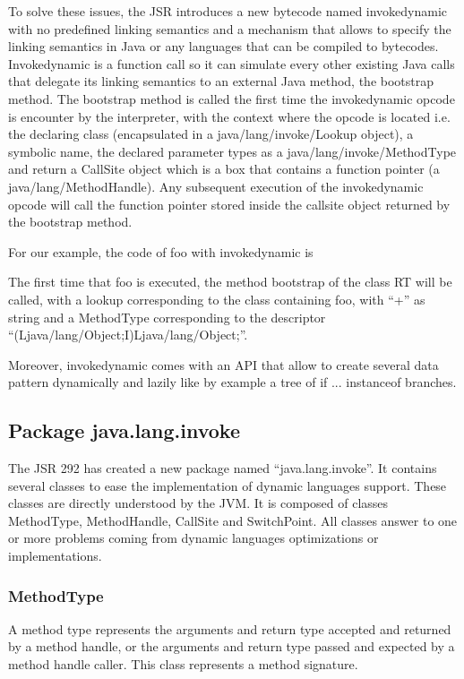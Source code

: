 \documentclass{sigplanconf}
\def \Jsr{JSR\xspace}
\def \JSR{\Jsr 292\xspace}
\def \JVM{JVM\xspace}
\begin{document}
      To solve these issues, the \Jsr introduces a new bytecode named invokedynamic with no predefined
      linking semantics and a mechanism that allows to specify the linking semantics in Java
      or any languages that can be compiled to bytecodes.
      Invokedynamic is a function call so it can simulate every other existing Java calls that delegate
      its linking semantics to an external Java method, the bootstrap method.
      The bootstrap method is called the first time the invokedynamic opcode is encounter by the interpreter,
      with the context where the opcode is located i.e.
      the declaring class (encapsulated in a java/lang/invoke/Lookup object), a symbolic name,
      the declared parameter types as a java/lang/invoke/MethodType and return
      a CallSite object which is a box that contains a function pointer (a java/lang/MethodHandle).
      Any subsequent execution of the invokedynamic opcode will call the function pointer
      stored inside the callsite object returned by the bootstrap method.
      
      For our example, the code of foo with invokedynamic is

      \newpage
      

      The first time that foo is executed, the method bootstrap of the class RT will be called, with a lookup corresponding to the class containing foo,
      with ``+'' as string and a MethodType corresponding to the descriptor ``(Ljava/lang/Object;I)Ljava/lang/Object;''.%

      

      Moreover, invokedynamic comes with an API that allow to create several data pattern
      dynamically and lazily like by example a tree of if ... instanceof branches.

    \subsection{Package java.lang.invoke}
      The \JSR has created a new package named ``java.lang.invoke''.
      It contains several classes to ease the implementation of dynamic languages support.
      These classes are directly understood by the \JVM.
      It is composed of classes MethodType, MethodHandle, CallSite and SwitchPoint.
      All classes answer to one or more problems coming from dynamic languages optimizations or implementations.

      \subsubsection{MethodType}
        A method type represents the arguments and return type accepted and returned by a method handle,
        or the arguments and return type passed and expected by a method handle caller.
        This class represents a method signature.
\end{document}
